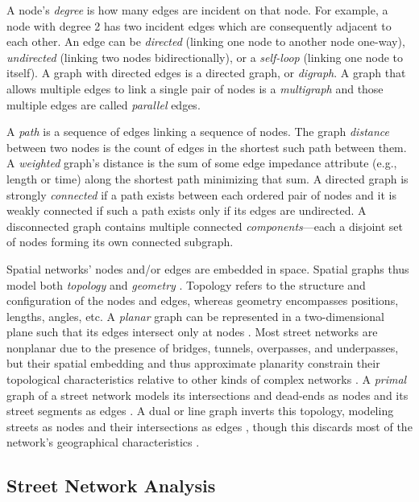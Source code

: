 \documentclass[12pt,letterpaper]{article} %
\begin{document}
A node's \textit{degree} is how many edges are incident on that node. For example, a node with degree 2 has two incident edges which are consequently adjacent to each other. An edge can be \textit{directed} (linking one node to another node one-way), \textit{undirected} (linking two nodes bidirectionally), or a \textit{self-loop} (linking one node to itself). A graph with directed edges is a directed graph, or \textit{digraph}. A graph that allows multiple edges to link a single pair of nodes is a \textit{multigraph} and those multiple edges are called \textit{parallel} edges.

A \textit{path} is a sequence of edges linking a sequence of nodes. The graph \textit{distance} between two nodes is the count of edges in the shortest such path between them. A \textit{weighted} graph's distance is the sum of some edge impedance attribute (e.g., length or time) along the shortest path minimizing that sum. A directed graph is strongly \textit{connected} if a path exists between each ordered pair of nodes and it is weakly connected if such a path exists only if its edges are undirected. A disconnected graph contains multiple connected \textit{components}---each a disjoint set of nodes forming its own connected subgraph.

Spatial networks' nodes and/or edges are embedded in space. Spatial graphs thus model both \textit{topology} and \textit{geometry} \citep{fischer_spatial_2014}. Topology refers to the structure and configuration of the nodes and edges, whereas geometry encompasses positions, lengths, angles, etc. A \textit{planar} graph can be represented in a two-dimensional plane such that its edges intersect only at nodes \citep{barthelemy_modeling_2008,barthelemy_spatial_2011}. Most street networks are nonplanar due to the presence of bridges, tunnels, overpasses, and underpasses, but their spatial embedding and thus approximate planarity constrain their topological characteristics relative to other kinds of complex networks \citep{boeing_planarity_2020}. A \textit{primal} graph of a street network models its intersections and dead-ends as nodes and its street segments as edges \citep{porta_network_2006-1}. A dual or line graph inverts this topology, modeling streets as nodes and their intersections as edges \citep{porta_network_2006}, though this discards most of the network's geographical characteristics \citep{ratti_space_2004}.

\subsection{Street Network Analysis}
\end{document}
